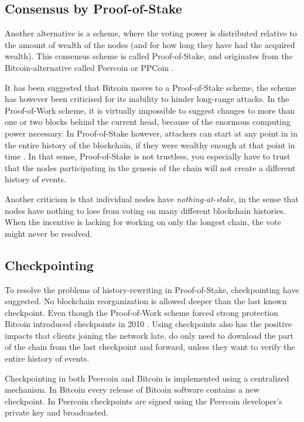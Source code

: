 \documentclass[oneside,a4paper,10pts,article]{memoir}
\begin{document}
\subsection{Consensus by Proof-of-Stake}
Another alternative is a scheme, where the voting power is distributed
relative to the amount of wealth of the nodes (and for how long they
have had the acquired wealth). This consensus scheme is called
Proof-of-Stake, and originates from the Bitcoin-alternative called
Peercoin or PPCoin \cite{king2012ppcoin}.

It has been suggested that Bitcoin moves to a Proof-of-Stake scheme,
the scheme has however been criticised for its inability to hinder
long-range attacks. In the Proof-of-Work scheme, it is virtually
impossible to suggest changes to more than one or two blocks behind
the current head, because of the enormous computing power
necessary. In Proof-of-Stake however, attackers can start at any point
in in the entire history of the blockchain, if they were wealthy
enough at that point in time \cite{buterin2014onstake}. In that sense,
Proof-of-Stake is not trustless, you especially have to trust that the
nodes participating in the genesis of the chain will not create a
different history of events.

Another criticism is that individual nodes have
\textit{nothing-at-stake}, in the sense that nodes have nothing to
lose from voting on many different blockchain histories. When the
incentive is lacking for working on only the longest chain, the vote
might never be resolved.

\subsection{Checkpointing}
To resolve the problems of history-rewriting in Proof-of-Stake,
checkpointing have suggested. No blockchain reorganization is allowed
deeper than the last known checkpoint. Even though the Proof-of-Work
scheme forced strong protection Bitcoin introduced checkpoints in 2010
\cite{king2012ppcoin}. Using checkpoints also has the positive impacts
that clients joining the network late, do only need to download the
part of the chain from the last checkpoint and forward, unless they
want to verify the entire history of events.

Checkpointing in both Peercoin and Bitcoin is implemented using a
centralized mechanism. In Bitcoin every release of Bitcoin software
contains a new checkpoint. In Peercoin checkpoints are signed using
the Peercoin developer's private key and broadcasted.
\end{document}

